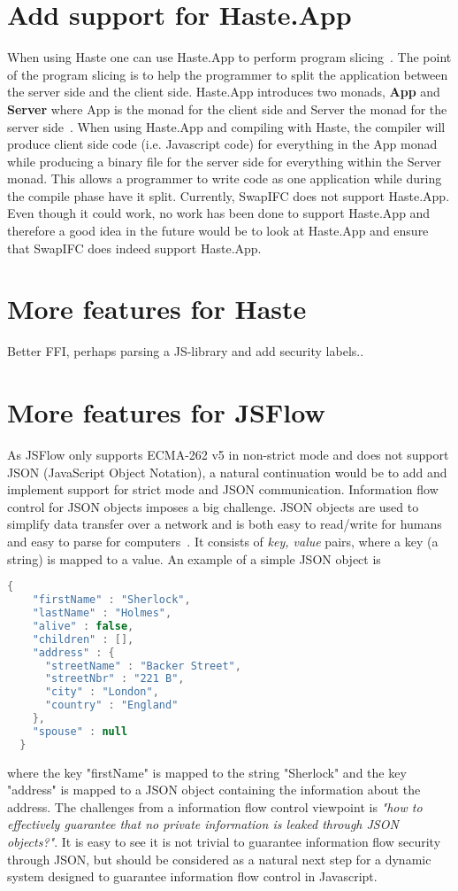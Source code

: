 \section{Add support for Haste.App}
When using Haste one can use Haste.App to perform program slicing~\cite{haste-symposium}. The point of the program slicing is to help the programmer to split the application between the server side and the client side. Haste.App introduces two monads, \textbf{App} and \textbf{Server} where App is the monad for the client side and Server the monad for the server side~\cite{haste-app}. When using Haste.App and compiling with Haste, the compiler will produce client side code (i.e. Javascript code) for everything in the App monad while producing a binary file for the server side for everything within the Server monad. This allows a programmer to write code as one application while during the compile phase have it split. Currently, SwapIFC does not support Haste.App. Even though it could work, no work has been done to support Haste.App and therefore a good idea in the future would be to look at Haste.App and ensure that SwapIFC does indeed support Haste.App.

\section{More features for Haste}
Better FFI, perhaps parsing a JS-library and add security labels..

\section{More features for JSFlow}
As JSFlow only supports ECMA-262 v5 in non-strict mode and does not support JSON (JavaScript Object Notation), a natural continuation would be to add and implement support for strict mode and JSON communication. Information flow control for JSON objects imposes a big challenge. JSON objects are used to simplify data transfer over a network and is both easy to read/write for humans and easy to parse for computers~\cite{json}. It consists of \emph{key, value} pairs, where a key (a string) is mapped to a value. An example of a simple JSON object is
\begin{lstlisting}[language=Java]
  {
    "firstName" : "Sherlock",
    "lastName" : "Holmes",
    "alive" : false,
    "children" : [],
    "address" : {
      "streetName" : "Backer Street",
      "streetNbr" : "221 B",
      "city" : "London",
      "country" : "England"
    },
    "spouse" : null
  }
\end{lstlisting}
where the key "firstName" is mapped to the string "Sherlock" and the key "address" is mapped to a JSON object containing the information about the address. The challenges from a information flow control viewpoint is \emph{"how to effectively guarantee that no private information is leaked through JSON objects?"}. It is easy to see it is not trivial to guarantee information flow security through JSON, but should be considered as a natural next step for a dynamic system designed to guarantee information flow control in Javascript.

